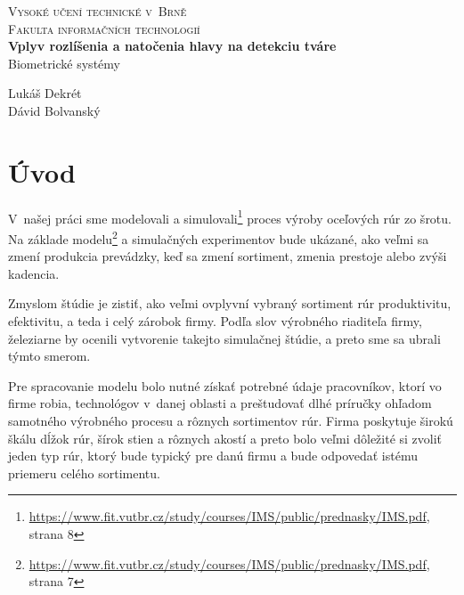 \documentclass[]{article}
\begin{document}
	
	\begin{titlepage}
		\begin{center}
			\textsc{{\LARGE Vysoké učení technické v~Brně\\[0.3em]
					Fakulta informačních technologií}}\\
			{\Huge \textbf{Vplyv rozlíšenia a natočenia hlavy na detekciu tváre}\\[0.5em]}
			\Large{Biometrické systémy}
		\end{center}
		
		{\noindent \large Lukáš Dekrét\\Dávid Bolvanský}
	\end{titlepage}
	
	\section{Úvod}
	V~našej práci sme modelovali a simulovali\footnote{\url{https://www.fit.vutbr.cz/study/courses/IMS/public/prednasky/IMS.pdf}, strana 8} proces výroby oceľových rúr zo šrotu. Na základe modelu\footnote{\url{https://www.fit.vutbr.cz/study/courses/IMS/public/prednasky/IMS.pdf}, strana 7} a simulačných experimentov bude ukázané, ako veľmi sa zmení produkcia prevádzky, keď sa zmení sortiment, zmenia prestoje alebo zvýši kadencia.
	
	Zmyslom štúdie je zistiť, ako veľmi ovplyvní vybraný sortiment rúr produktivitu, efektivitu, a teda i celý zárobok firmy. Podľa slov výrobného riaditeľa firmy, železiarne by ocenili vytvorenie takejto simulačnej štúdie, a preto sme sa ubrali týmto smerom.
	
	Pre spracovanie modelu bolo nutné získať potrebné údaje pracovníkov, ktorí vo firme robia, technológov v~danej oblasti a preštudovať dlhé príručky ohľadom samotného výrobného procesu a rôznych sortimentov rúr. Firma poskytuje širokú škálu dĺžok rúr, šírok stien a rôznych akostí a preto bolo veľmi dôležité si zvoliť jeden typ rúr, ktorý bude typický pre danú firmu a bude odpovedať istému priemeru celého sortimentu.
	
	
\end{document}
